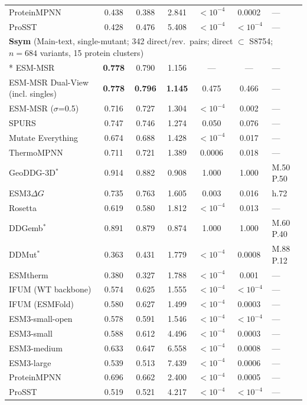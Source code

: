 {\begin{longtable}{lcccccl}
ProteinMPNN & 0.438 & 0.388 & 2.841 & $<10^{-4}$ & 0.0002 & --- \\
ProSST & 0.428 & 0.476 & 5.408 & $<10^{-4}$ & $<10^{-4}$ & --- \\
\midrule
\multicolumn{7}{l}{\textbf{Ssym} (Main-text, single-mutant; 342 direct/rev.\ pairs; direct $\subset$ S8754; $n=684$ variants, 15 protein clusters)} \\*
\midrule
ESM-MSR & \textbf{0.778} & 0.790 & 1.156 & --- & --- & --- \\
ESM-MSR Dual-View (incl. singles) & \textbf{0.778} & \textbf{0.796} & \textbf{1.145} & 0.475 & 0.466 & --- \\
ESM-MSR ($\sigma$=0.5) & 0.716 & 0.727 & 1.304 & $<10^{-4}$ & 0.002 & --- \\
SPURS & 0.747 & 0.746 & 1.274 & 0.050 & 0.076 & --- \\
Mutate Everything & 0.674 & 0.688 & 1.428 & $<10^{-4}$ & 0.017 & --- \\
ThermoMPNN & 0.711 & 0.721 & 1.389 & 0.0006 & 0.018 & --- \\
GeoDDG-3D$^*$ & 0.914 & 0.882 & 0.908 & 1.000 & 1.000 & M.50 P.50 \\
ESM3$\Delta G$ & 0.735 & 0.763 & 1.605 & 0.003 & 0.016 & h.72 \\
Rosetta & 0.619 & 0.580 & 1.812 & $<10^{-4}$ & 0.013 & --- \\
DDGemb$^*$ & 0.891 & 0.879 & 0.874 & 1.000 & 1.000 & M.60 P.40 \\
DDMut$^*$ & 0.363 & 0.431 & 1.779 & $<10^{-4}$ & 0.0008 & M.88 P.12 \\
ESMtherm & 0.380 & 0.327 & 1.788 & $<10^{-4}$ & 0.001 & --- \\
IFUM (WT backbone) & 0.574 & 0.625 & 1.555 & $<10^{-4}$ & $<10^{-4}$ & --- \\
IFUM (ESMFold) & 0.580 & 0.627 & 1.499 & $<10^{-4}$ & 0.0003 & --- \\
ESM3-small-open & 0.578 & 0.591 & 1.546 & $<10^{-4}$ & $<10^{-4}$ & --- \\
ESM3-small & 0.588 & 0.612 & 4.496 & $<10^{-4}$ & 0.0003 & --- \\
ESM3-medium & 0.633 & 0.647 & 6.558 & $<10^{-4}$ & 0.0008 & --- \\
ESM3-large & 0.539 & 0.513 & 7.439 & $<10^{-4}$ & 0.0006 & --- \\
ProteinMPNN & 0.696 & 0.662 & 2.400 & $<10^{-4}$ & 0.0005 & --- \\
ProSST & 0.519 & 0.521 & 4.217 & $<10^{-4}$ & $<10^{-4}$ & --- \\
\end{longtable}
}




